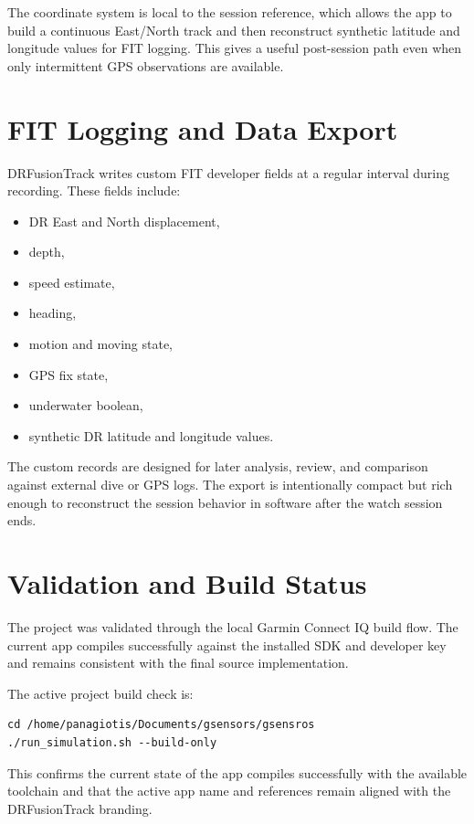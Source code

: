 \documentclass[conference]{IEEEtran}
\begin{document}
The coordinate system is local to the session reference, which allows the app to build a continuous East/North track and then reconstruct synthetic latitude and longitude values for FIT logging. This gives a useful post-session path even when only intermittent GPS observations are available.

\section{FIT Logging and Data Export}
DRFusionTrack writes custom FIT developer fields at a regular interval during recording. These fields include:

\begin{itemize}
\item DR East and North displacement,
\item depth,
\item speed estimate,
\item heading,
\item motion and moving state,
\item GPS fix state,
\item underwater boolean,
\item synthetic DR latitude and longitude values.
\end{itemize}

The custom records are designed for later analysis, review, and comparison against external dive or GPS logs. The export is intentionally compact but rich enough to reconstruct the session behavior in software after the watch session ends.

\section{Validation and Build Status}
The project was validated through the local Garmin Connect IQ build flow. The current app compiles successfully against the installed SDK and developer key and remains consistent with the final source implementation.

The active project build check is:

\begin{lstlisting}[basicstyle=\ttfamily\scriptsize, breaklines=true, columns=fullflexible]
cd /home/panagiotis/Documents/gsensors/gsensros
./run_simulation.sh --build-only
\end{lstlisting}

This confirms the current state of the app compiles successfully with the available toolchain and that the active app name and references remain aligned with the DRFusionTrack branding.
\end{document}

